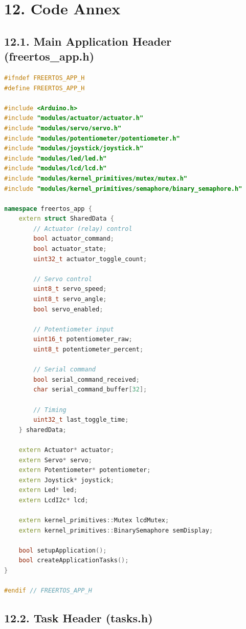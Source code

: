 \documentclass[12pt]{article}
\begin{document}
\section*{12. Code Annex}

\subsection*{12.1. Main Application Header (freertos\_app.h)}

\begin{lstlisting}[language=C++, caption=freertos\_app.h - Application Interface]
#ifndef FREERTOS_APP_H
#define FREERTOS_APP_H

#include <Arduino.h>
#include "modules/actuator/actuator.h"
#include "modules/servo/servo.h"
#include "modules/potentiometer/potentiometer.h"
#include "modules/joystick/joystick.h"
#include "modules/led/led.h"
#include "modules/lcd/lcd.h"
#include "modules/kernel_primitives/mutex/mutex.h"
#include "modules/kernel_primitives/semaphore/binary_semaphore.h"

namespace freertos_app {
    extern struct SharedData {
        // Actuator (relay) control
        bool actuator_command;
        bool actuator_state;
        uint32_t actuator_toggle_count;

        // Servo control
        uint8_t servo_speed;
        uint8_t servo_angle;
        bool servo_enabled;

        // Potentiometer input
        uint16_t potentiometer_raw;
        uint8_t potentiometer_percent;

        // Serial command
        bool serial_command_received;
        char serial_command_buffer[32];

        // Timing
        uint32_t last_toggle_time;
    } sharedData;

    extern Actuator* actuator;
    extern Servo* servo;
    extern Potentiometer* potentiometer;
    extern Joystick* joystick;
    extern Led* led;
    extern LcdI2c* lcd;

    extern kernel_primitives::Mutex lcdMutex;
    extern kernel_primitives::BinarySemaphore semDisplay;

    bool setupApplication();
    bool createApplicationTasks();
}

#endif // FREERTOS_APP_H
\end{lstlisting}

\subsection*{12.2. Task Header (tasks.h)}
\end{document}

